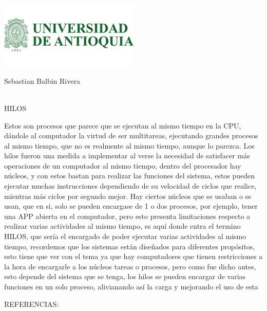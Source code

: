 \documentclass{letter}
\begin{document}
\begin{center}
\includegraphics[width=0.5\textwidth]{logo-udea.png}\\
\end{center}

Sebastian Balbin Rivera\\\\
\begin{center}
HILOS
\end{center}
Estos son procesos que parece que se ejecutan al mismo tiempo en la CPU, dándole al computador la virtud de ser multitareas, ejecutando grandes procesos al mismo tiempo, que no es realmente al mismo tiempo, aunque lo parezca. Los hilos fueron una medida a implementar al verse la necesidad de satisfacer más operaciones de un computador al mismo tiempo, dentro del procesador hay núcleos, y con estos bastan para realizar las funciones del sistema, estos pueden ejecutar muchas instrucciones dependiendo de su velocidad de ciclos que realice, mientras más ciclos por segundo mejor. 
Hay ciertos núcleos que se usaban o se usan, que en si, solo se pueden encargase de 1 o dos procesos, por ejemplo, tener una APP abierta en el computador, pero esto presenta limitaciones respecto a realizar varias actividades al mismo tiempo, es aquí donde entra el termino HILOS, que sería el encargado de poder ejecutar varias actividades al mismo tiempo, recordemos que los sistemas están diseñados para diferentes propósitos, esto tiene que ver con el tema ya que hay computadores que tienen restricciones a la hora de encargarle a los núcleos tareas o procesos, pero como fue dicho antes, esto depende del sistema que se tenga, los hilos se pueden encargar de varias funciones en un solo proceso, alivianando así la carga y mejorando el uso de esta


\newpage
REFERENCIAS:\\\\
\end{document}
